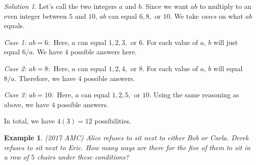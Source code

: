 \documentclass[letterpaper]{article}
\newtheorem{example}[thm]{Example}
\theoremstyle{remark}
\newtheorem*{solution}{Solution}
\theoremstyle{definition}
\begin{document}
\begin{solution}


Let's call the two integers $a$ and $b$. Since we want $ab$ to multiply to an even integer between $5$ and $10$, $ab$ can equal $6, 8, $ or $10$. We take \textit{cases} on what $ab$ equals.
\newline

\textit{Case 1:} $ab=6:$ Here, $a$ can equal $1, 2, 3,$ or $6$. For each value of $a$, $b$ will just equal $6/a$. We have $4$ possible answers here.
\newline

\textit{Case 2:} $ab=8:$ Here, $a$ can equal $1, 2, 4,$ or $8$. For each value of $a$, $b$ will equal $8/a$. Therefore, we have $4$ possible answers.
\newline

\textit{Case 3:} $ab=10:$ Here, $a$ can equal $1, 2, 5,$ or $10$. Using the same reasoning as above, we have $4$ possible answers.
\newline

In total, we have $4(3)=12$ possibilities.
\end{solution}

\bigskip

\begin{example}
(2017 AMC) Alice refuses to sit next to either Bob or Carla. Derek refuses to sit next to Eric. How many ways are there for the five of them to sit in a row of $5$ chairs under these conditions?
\end{example}
\end{document}
